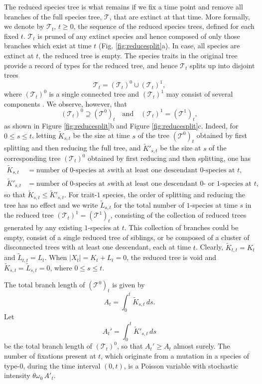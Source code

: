 \documentclass[a4paper,11pt]{article}
\theoremstyle{plain}
\theoremstyle{definition}
\numberwithin{equation}{section}
\begin{document}
The reduced species tree is what remains if we fix a time point
and remove all branches of the full species tree, $\mathcal T$, that are extinct at
that time.  More formally, we denote by $\mathcal T_t$, $t\ge 0$, the sequence
of the reduced species trees, defined for each fixed $t$. 
$\mathcal T_t$ is pruned of any extinct species and hence composed of only those
branches which exist at time $t$ (Fig. \ref{fig:reducesplit}a). In
case, all species are extinct at $t$, the reduced tree is empty. The
species traits in the original tree provide a record of types for the reduced
tree, and hence $\mathcal T_t$ splits up into disjoint 
trees
\[
\mathcal T_t=(\mathcal T_t)^0\cup (\mathcal T_t)^1,
\]
where $(\mathcal T_t)^0$ is a single connected tree and
$(\mathcal T_t)^1$ may consist of several components . We observe,
however, that 
\[
(\mathcal T_t)^0\supseteq (\mathcal T^0)_t \quad \mbox{and} \quad
(\mathcal T_t)^1= (\mathcal T^1)_t,
\]
as shown in Figure \ref{fig:reducesplit}b and Figure \ref{fig:reducesplit}c. 
Indeed, for $0\le s\le t$, letting $\widetilde K_{s,t}$ be the size at
time $s$ of the tree $(\mathcal T^\mathrm{0})_t$ obtained by first splitting
and then reducing the full tree, and $\widetilde K'_{s,t}$ be the size
at $s$ of the corresponding tree $(\mathcal T_t)^\mathrm{0}$ obtained by
first reducing and then splitting, one has
\begin{align*}
\widetilde K_{s,t} &=\mbox{number of $0$-species at $s$
with at least one descendant $0$-species at $t$},\\
\widetilde K'_{s,t}&=\mbox{number of $0$-species at $s$
with at least one descendant $0$- or $1$-species at $t$},
\end{align*}
so that $\widetilde K_{s,t}\le \widetilde K'_{s,t}$.  For trait-$1$
species, the order of splitting and reducing the tree has no effect and
we write $\widetilde L_{s,t}$ for the total number of $1$-species at
time $s$ in the reduced tree $(\mathcal T_t)^1=(\mathcal T^1)_t$, consisting of the
collection of reduced trees generated by any existing $1$-species at
$t$. This collection of branches could be empty, consist of a single
reduced tree of siblings, or be composed of a cluster of disconnected
trees with at least one descendant, each at time $t$.  Clearly,
$\widetilde K_{t,t}=K_t$ and $\widetilde L_{t,t}=L_t$. When
$|X_t|=K_t+L_t=0$, the reduced tree is void and $\widetilde
K_{s,t}=\widetilde L_{s,t}=0$, where $0\le s\le t$.

The total branch length of $(\mathcal T^0)_t$ is given by
\begin{equation}\label{totalbranchout}
A_t=\int_0^t \widetilde K_{s,t}\,ds.
\end{equation} 
Let  
\begin{equation}\label{totalbranchoutplus}
A_t'=\int_0^t \widetilde K'_{s,t}\,ds
\end{equation} 
be the total branch length of $(\mathcal T_t)^0$, so that $A_t'\ge A_t$ almost
surely. The number of fixations
present at $t$, which originate from a mutation in a species of type-$0$,
 during the time interval $(0,t)$, is a Poisson variable with
stochastic intensity $\theta\omega_0\, A'_t$.  
\end{document}
